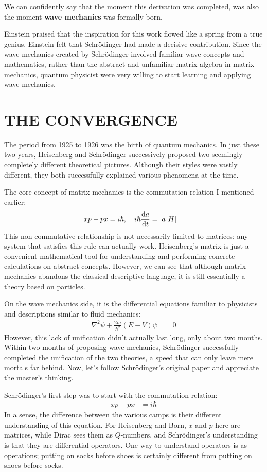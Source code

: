 \documentclass[a4paper, 12pt, oneside, onecolumn]{article}
\newcommand{\cald}{{\rm d}}
\begin{document}
\begin{multicols}{2}
We can confidently say that the moment this derivation was completed, was also the moment \textbf{wave mechanics} was formally born. 

Einstein praised that the inspiration for this work flowed like a spring from a true genius. Einstein felt that Schrödinger had made a decisive contribution. Since the wave mechanics created by Schrödinger involved familiar wave concepts and mathematics, rather than the abstract and unfamiliar matrix algebra in matrix mechanics, quantum physicist were very willing to start learning and applying wave mechanics.
\section{THE CONVERGENCE}
The period from 1925 to 1926 was the birth of quantum mechanics. In just these two years, Heisenberg and Schrödinger successively proposed two seemingly completely different theoretical pictures. Although their styles were vastly different, they both successfully explained various phenomena at the time.

The core concept of matrix mechanics is the commutation relation I mentioned earlier:
\begin{align}
	x p - p x
	&= i \hbar, \quad i \hbar \frac{\cald a}{\cald t} = \left[a~H \right]
\end{align}
This non-commutative relationship is not necessarily limited to matrices; any system that satisfies this rule can actually work. Heisenberg's matrix is just a convenient mathematical tool for understanding and performing concrete calculations on abstract concepts. However, we can see that although matrix mechanics abandons the classical descriptive language, it is still essentially a theory based on particles.

On the wave mechanics side, it is the differential equations familiar to physicists and descriptions similar to fluid mechanics:
\begin{align}
	\nabla^2 \psi + \frac{2 m }{\hbar^2} \left( E - V \right) \psi
	&= 0
\end{align}
However, this lack of unification didn't actually last long, only about two months. Within two months of proposing wave mechanics, Schrödinger successfully completed the unification of the two theories, a speed that can only leave mere mortals far behind. Now, let's follow Schrödinger's original paper\cite{PhysRev.28.1049} and appreciate the master's thinking.

Schrödinger's first step was to start with the commutation relation:
\begin{align}
	x p - p x
	&= i \hbar
\end{align}
In a sense, the difference between the various camps is their different understanding of this equation. For Heisenberg and Born, $x$ and $p$ here are matrices, while Dirac sees them as $Q$-numbers, and Schrödinger's understanding is that they are differential operators. One way to understand operators is as operations; putting on socks before shoes is certainly different from putting on shoes before socks.


\end{multicols}
\end{document}
